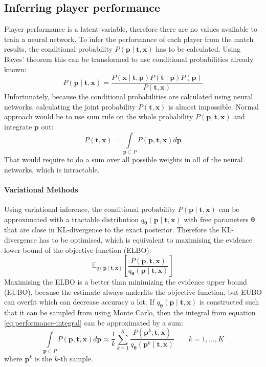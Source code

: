 \documentclass[12pt,a4paper]{book}
\newcommand\bs[1]{\boldsymbol{#1}}
\begin{document}
\subsection{Inferring player performance}
Player performance is a latent variable, therefore there are no values available to train a neural network.
To infer the performance of each player from the match results, the conditional probability $P(\bs{p}\mid\bs{t},\bs{x})$ has to be calculated.
Using Bayes' theorem this can be transformed to use conditional probabilities already known:
\begin{equation*}
P(\bs{p}\mid\bs{t},\bs{x}) = \frac{P(\bs{x}\mid\bs{t},\bs{p})P(\bs{t}\mid\bs{p})P(\bs{p})}{P(\bs{t},\bs{x})}
\end{equation*}
Unfortunately, because the conditional probabilities are calculated using neural networks, calculating the joint probability $P(\bs{t},\bs{x})$ is almost impossible.
Normal approach would be to use sum rule on the whole probability $P(\bs{p},\bs{t},\bs{x})$ and integrate $\bs{p}$ out:
\begin{equation}
P(\bs{t},\bs{x})=\int\limits_{\bs{p}\subset P} P(\bs{p},\bs{t},\bs{x}) d\bs{p}
\label{eq:performance-integral}
\end{equation}
That would require to do a sum over all possible weights in all of the neural networks, which is intractable. 

\paragraph{Variational Methods}
Using variational inference, the conditional probability $P(\bs{p}\mid\bs{t},\bs{x})$ can be approximated with a tractable distribution $q_{\bs{\theta}}(\bs{p}\mid\bs{t},\bs{x})$ with free parameters $\bs{\theta}$ that are close in KL-divergence to the exact posterior.
Therefore the KL-divergence has to be optimised, which is equivalent to maximising the evidence lower bound of the objective function (ELBO):
\begin{equation*}
\mathbb{E}_{q(\bs{p}\mid\bs{t},\bs{x})}\left[\frac{P(\bs{p},\bs{t},\bs{x})}{q_{\bs{\theta}}(\bs{p}\mid\bs{t},\bs{x})}\right]
\end{equation*}
Maximising the ELBO is a better than minimizing the evidence upper bound (EUBO), because the estimate always underfits the objective function, but EUBO can overfit which can decrease accuracy a lot.
If $q_{\bs{\theta}}(\bs{p}\mid\bs{t},\bs{x})$ is constructed such that it can be sampled from using Monte Carlo, then the integral from equation \ref{eq:performance-integral} can be approximated by a sum:
\begin{equation*}
\int\limits_{\bs{p}\subset P} P(\bs{p},\bs{t},\bs{x}) d\bs{p} \approx \frac{1}{k}\sum\limits_{k=1}^{K}\frac{P(\bs{p}^k,\bs{t},\bs{x})}{q_{\bs{\theta}}(\bs{p}^k\mid\bs{t},\bs{x})} \qquad k=1,\dots,K
\end{equation*}
where $\bs{p}^k$ is the $k$-th sample.
\end{document}

